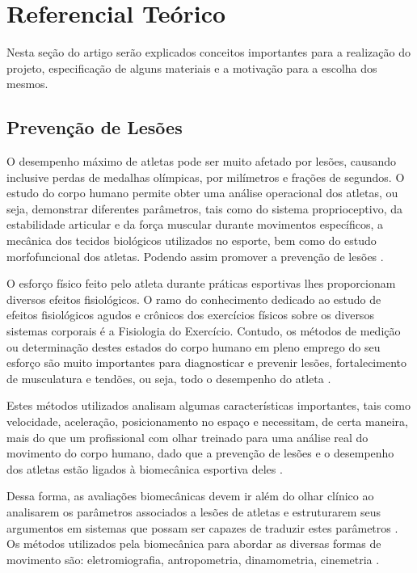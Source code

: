 
\chapter[Referencial Teórico]{Referencial Teórico}
Nesta seção do artigo serão explicados conceitos importantes para a realização do projeto, especificação de alguns materiais e a motivação para a escolha dos mesmos.  

\section{Prevenção de Lesões}

O desempenho máximo de atletas pode ser muito afetado por lesões, causando inclusive perdas de medalhas olímpicas, por milímetros e frações de segundos. O estudo do corpo humano permite obter uma análise operacional dos atletas, ou seja, demonstrar diferentes parâmetros, tais como do sistema proprioceptivo, da estabilidade articular e da força muscular durante movimentos específicos, a mecânica dos tecidos biológicos utilizados no esporte, bem como do estudo morfofuncional dos atletas. Podendo assim promover a prevenção de lesões \cite{miziara2014}.  

O esforço físico feito pelo atleta durante práticas esportivas lhes proporcionam diversos efeitos fisiológicos. O ramo do conhecimento dedicado ao estudo de efeitos fisiológicos agudos e crônicos dos exercícios físicos sobre os diversos sistemas corporais é a Fisiologia do Exercício. Contudo, os métodos de medição ou determinação destes estados do corpo humano em pleno emprego do seu esforço são muito importantes para diagnosticar e prevenir lesões, fortalecimento de musculatura e tendões, ou seja, todo o desempenho do atleta \cite{rocha2005}.

Estes métodos utilizados analisam algumas características importantes, tais como velocidade, aceleração, posicionamento no espaço e necessitam, de certa maneira, mais do que um profissional com olhar treinado para uma análise real do movimento do corpo humano, dado que a prevenção de lesões e o desempenho dos atletas estão ligados à biomecânica esportiva deles \cite{amadio2000}.

Dessa forma, as avaliações biomecânicas devem ir além do olhar clínico ao analisarem os parâmetros associados a lesões de atletas e estruturarem seus argumentos em sistemas que possam ser capazes de traduzir estes parâmetros \cite{miziara2014}. Os métodos utilizados pela biomecânica para abordar as diversas formas de movimento são: eletromiografia, antropometria, dinamometria, cinemetria \cite{amadio2007}.

